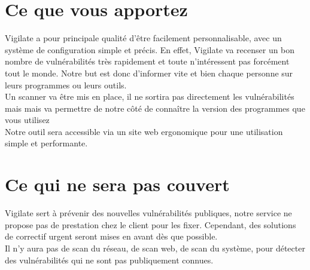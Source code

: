 \section{Ce que vous apportez}
\thispagestyle{plain}

Vigilate a pour principale qualité d’être facilement personnalisable, avec un système de configuration simple et précis. En effet, Vigilate va recenser un bon nombre de vulnérabilités très rapidement et toute n’intéressent pas forcément tout le monde. Notre but est donc d’informer vite et bien chaque personne sur leurs programmes ou leurs outils.\\
Un scanner va être mis en place, il ne sortira pas directement les vulnérabilités mais mais va permettre de notre côté de connaître la version des programmes que vous utilisez\\
Notre outil sera accessible via un site web ergonomique pour une utilisation simple et performante.\\

\section{Ce qui ne sera pas couvert}
\thispagestyle{plain}
Vigilate sert à prévenir des nouvelles vulnérabilités publiques, notre service ne propose pas de prestation chez le client pour les fixer. Cependant, des solutions de correctif urgent seront mises en avant dès que possible.\\
Il n’y aura pas de scan du réseau, de scan web, de scan du système, pour détecter des vulnérabilités qui ne sont pas publiquement connues.\\
